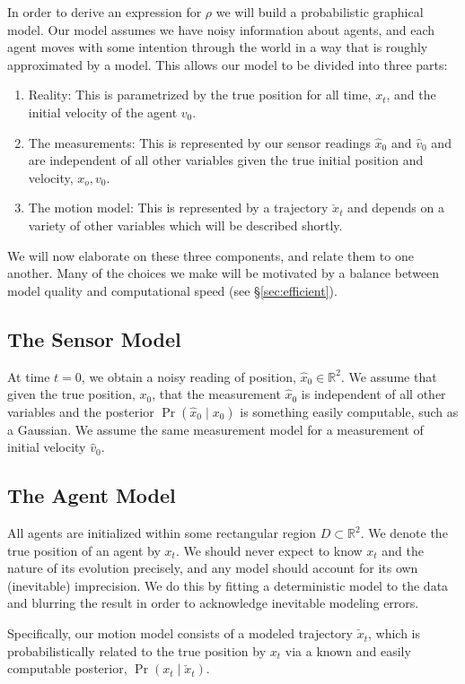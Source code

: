 \documentclass[conference]{IEEEtran}
\begin{document}
In order to derive an expression for $\rho$ we will build a probabilistic graphical model.
Our model assumes we have noisy information about agents, and each agent moves with some intention through the world in a way that is roughly approximated by a model.
This allows our model to be divided into three parts:
\begin{enumerate}
	\item Reality:  This is parametrized by the true position for all time, $x_t$, and the initial velocity of the agent $v_0$.
	\item The measurements:  This is represented by our sensor readings $\hat{x}_0$ and $\hat{v}_0$ and are independent of all other variables given the true initial position and velocity, $x_o, v_0$.
	\item The motion model:  This is represented by a trajectory $\check{x}_t$ and depends on a variety of other variables which will be described shortly.
\end{enumerate}
We will now elaborate on these three components, and relate them to one another.
Many of the choices we make will be motivated by a balance between model quality and computational speed (see \S \ref{sec:efficient}).

\subsection{The Sensor Model}
At time $t=0$, we obtain a noisy reading of position, $\hat{x}_0 \in \mathbb{R}^2$.
We assume that given the true position, $x_0$, that the measurement $\hat{x}_0$ is independent of all other variables and the posterior $\Pr( \hat{x}_0 \mid x_0)$
is something easily computable, such as a Gaussian.
We assume the same measurement model for a measurement of initial velocity $\hat{v}_0$.

\subsection{The Agent Model}
All agents are initialized within some rectangular region $D \subset \mathbb{R}^2$.
We denote the true position of an agent by $x_t$.
We should never expect to know $x_t$ and the nature of its evolution precisely, and any model should account for its own (inevitable) imprecision.
We do this by fitting a deterministic model to the data and blurring the result in order to acknowledge inevitable modeling errors.

Specifically, our motion model consists of a modeled trajectory $\check{x}_t$, which is probabilistically related to the true position by $x_t$ via a known and easily computable posterior, $\Pr(x_t \mid \check{x}_t)$.
\end{document}
